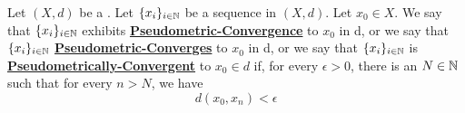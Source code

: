 \label{def:pseudometricsequenceconvergence}
\newcommand{\PseudometricConvergence}[0]{\textbf{\hyperref[def:pseudometricsequenceconvergence]{Pseudometric-Convergence}}\xspace}
\newcommand{\PseudometricConvergent}[0]{\textbf{\hyperref[def:pseudometricsequenceconvergence]{Pseudometrically-Convergent}}\xspace}
\newcommand{\PseudometricConverges}[0]{\textbf{\hyperref[def:pseudometricsequenceconvergence]{Pseudometric-Converges}}\xspace}
\begin{df}
    Let $(X,d)$ be a \PseudometricSpace.
	Let $\{x_i\}_{i \in \mathbb{N}}$ be a sequence in $(X,d)$.
    Let $x_0 \in X$.  
    We say that 
	$\{x_i\}_{i \in \mathbb{N}}$ 
	exhibits 
	\PseudometricConvergence 
	to 
	$x_0$ 
	in d,
	or we say that 
	$\{x_i\}_{i \in \mathbb{N}}$  
	\PseudometricConverges 
	to 
	$x_0$ 
	in d, 
	or we say that 
	$\{x_i\}_{i \in \mathbb{N}}$ 
	is 
	\PseudometricConvergent 
	to 
	$x_0 \in d$ 
	if, 
    for every 
	$\epsilon > 0$, 
	there is an 
	$N \in \mathbb{N}$ 
	such that for every 
	$n>N$, 
	we have 
    \begin{equation}
        d(x_0, x_n) < \epsilon
    \end{equation}
\end{df}
